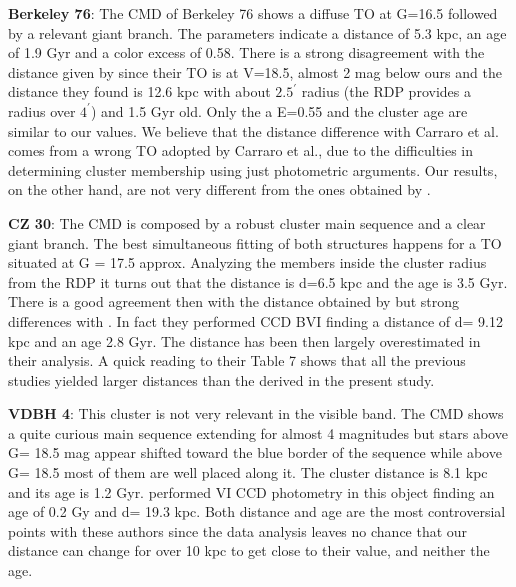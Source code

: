 \documentclass[draft]{aa}
\begin{document}
\textbf{Berkeley 76}:
The CMD of Berkeley 76 shows a diffuse TO at G=16.5 followed by a relevant giant branch. The parameters indicate a distance of 5.3 kpc, an age of 1.9 Gyr and a color excess of 0.58. There is a strong disagreement with the distance given by \cite{2013MNRAS.428..502C} since their TO is at V=18.5, almost 2 mag below ours and the distance they found is 12.6 kpc with about $2.5^{\prime}$ radius (the RDP provides a radius over $4^{\prime}$) and 1.5 Gyr old. Only the a E=0.55 and the cluster age are similar to our values. We believe that the distance difference with Carraro et al. comes from a wrong TO adopted by Carraro et al., due to the difficulties in determining cluster membership using just photometric arguments. Our results, on the other hand, are not very different from the ones obtained by \cite{Cantat_2020}. 


\textbf{CZ 30}: 
The CMD is composed by a robust cluster main sequence and a clear giant branch. The best simultaneous fitting of both structures happens for a TO situated at G = 17.5 approx. Analyzing the members inside the cluster radius from the RDP it turns out that the distance is d=6.5 kpc and the age is 3.5 Gyr. There is a good agreement then with the distance obtained by \cite{Cantat_2020} but strong differences with \cite{2015AJ....150..200H}. In fact they performed CCD BVI finding a distance of d= 9.12 kpc and an age 2.8 Gyr. The distance has been then largely overestimated in their analysis. A quick reading to their Table 7 shows that all the previous studies yielded larger distances than the derived in the present study.

\textbf{VDBH 4}:
This cluster is not very relevant in the visible band. The CMD shows a quite curious main sequence extending for almost 4 magnitudes but stars above G= 18.5 mag appear shifted toward the blue border of the sequence while above G= 18.5 most of them are well placed along it. The cluster distance is 8.1 kpc and its age is 1.2 Gyr. \cite{2007A&A...464..573C} performed VI CCD photometry in this object finding an age of 0.2 Gy and d= 19.3 kpc. Both distance and age are the most controversial points with these authors since the data analysis leaves no chance that our distance can change for over 10 kpc to get close to their value, and neither the age. 
\end{document}
